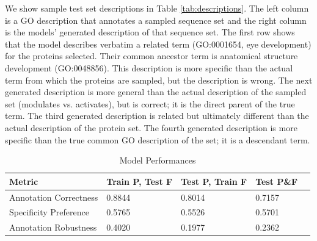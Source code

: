 \documentclass{article}
\begin{document}
        We show sample test set descriptions in Table \ref{tab:descriptions}. The left column is a GO description that annotates a sampled sequence set and the right column is the models' generated description of that sequence set. The first row shows that the model describes verbatim a related term (GO:0001654, eye development) for the proteins selected. Their common ancestor term is anatomical structure development (GO:0048856). This description is more specific than the actual term from which the proteins are sampled, but the description is wrong. The next generated description is more general than the actual description of the sampled set (modulates vs. activates), but is correct; it is the direct parent of the true term. The third generated description is related but ultimately different than the actual description of the protein set. The fourth generated description is more specific than the true common GO description of the set; it is a descendant term.
\begin{table}
	\caption{Model Performances}
	\centering
	\begin{tabular}{l|llll}
		\toprule
        Metric & Train P, Test F & Test P, Train F & Test P\&F \\
		\midrule
        Annotation Correctness & 0.8844 & 0.8014 & 0.7157 \\
        Specificity Preference & 0.5765 & 0.5526 & 0.5701 \\
		Annotation Robustness & 0.4020 & 0.1977 & 0.2362 \\
		\bottomrule
	\end{tabular}
	\label{tab:performances}
\end{table}
\end{document}
